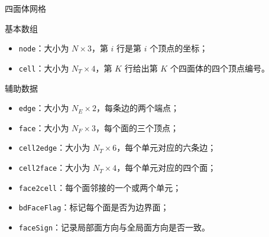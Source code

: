 \documentclass[aspectratio=169,professionalfonts]{ctexbeamer}
\begin{document}
\begin{frame}{四面体网格}

\begin{block}{基本数组}
\begin{itemize}
  \item \texttt{node}：大小为 $N\times 3$，第 $i$ 行是第 $i$ 个顶点的坐标；
  \item \texttt{cell}：大小为 $N_T\times 4$，第 $K$ 行给出第 $K$ 个四面体的四个顶点编号。
\end{itemize}
\end{block}

\begin{block}{辅助数据}
\begin{itemize}
  \item \texttt{edge}：大小为 $N_E\times 2$，每条边的两个端点；
  \item \texttt{face}：大小为 $N_F\times 3$，每个面的三个顶点；
  \item \texttt{cell2edge}：大小为 $N_T\times 6$，每个单元对应的六条边；
  \item \texttt{cell2face}：大小为 $N_T\times 4$，每个单元对应的四个面；
  \item \texttt{face2cell}：每个面邻接的一个或两个单元；
  \item \texttt{bdFaceFlag}：标记每个面是否为边界面；
  \item \texttt{faceSign}：记录局部面方向与全局面方向是否一致。
\end{itemize}
\end{block}

\end{frame}
\end{document}
